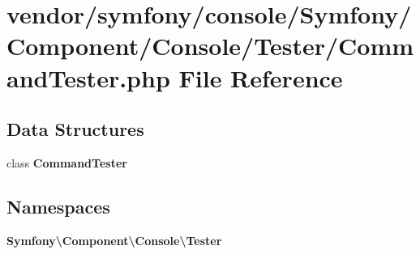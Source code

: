 \section{vendor/symfony/console/\+Symfony/\+Component/\+Console/\+Tester/\+Command\+Tester.php File Reference}
\label{_command_tester_8php}
\subsection*{Data Structures}
\begin{DoxyCompactItemize}
\item 
class {\bf Command\+Tester}
\end{DoxyCompactItemize}
\subsection*{Namespaces}
\begin{DoxyCompactItemize}
\item 
 {\bf Symfony\textbackslash{}\+Component\textbackslash{}\+Console\textbackslash{}\+Tester}
\end{DoxyCompactItemize}
